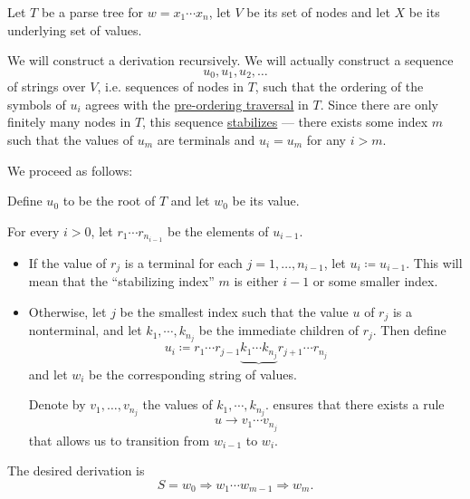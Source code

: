 \begin{algorithm}\label{alg:parse_tree_to_leftmost_derivation}
  Let \( T \) be a parse tree for \( w = x_1 \cdots x_n \), let \( V \) be its set of nodes and let \( X \) be its underlying set of values.

  We will construct a derivation recursively. We will actually construct a sequence
  \begin{equation*}
    u_0, u_1, u_2, \ldots
  \end{equation*}
  of strings over \( V \), i.e. sequences of nodes in \( T \), such that the ordering of the symbols of \( u_i \) agrees with the \hyperref[def:traversal_ordering]{pre-ordering traversal} in \( T \). Since there are only finitely many nodes in \( T \), this sequence \hyperref[def:stabilizing_sequence]{stabilizes} --- there exists some index \( m \) such that the values of \( u_m \) are terminals and \( u_i = u_m \) for any \( i > m \).

  We proceed as follows:
  \begin{thmenum}
     Define \( u_0 \) to be the root of \( T \) and let \( w_0 \) be its value.

     For every \( i > 0 \), let \( r_1 \cdots r_{n_{i-1}} \) be the elements of \( u_{i-1} \).

    \begin{itemize}
      \item If the value of \( r_j \) is a terminal for each \( j = 1, \ldots, n_{i-1} \), let \( u_i \coloneqq u_{i-1} \). This will mean that the \enquote{stabilizing index} \( m \) is either \( i - 1 \) or some smaller index.

      \item Otherwise, let \( j \) be the smallest index such that the value \( u \) of \( r_j \) is a nonterminal, and let \( k_1, \cdots, k_{n_j} \) be the immediate children of \( r_j \). Then define
      \begin{equation*}
        u_i \coloneqq r_1 \cdots r_{j-1} \underbrace{ k_1 \cdots k_{n_j} } r_{j+1} \cdots r_{n_j}
      \end{equation*}
      and let \( w_i \) be the corresponding string of values.

      Denote by \( v_1, \ldots, v_{n_j} \) the values of \( k_1, \cdots, k_{n_j} \).  ensures that there exists a rule
      \begin{equation*}
        u \to v_1 \cdots v_{n_j}
      \end{equation*}
      that allows us to transition from \( w_{i-1} \) to \( w_i \).
    \end{itemize}

     The desired derivation is
    \begin{equation*}
      S = w_0 \Rightarrow w_1 \cdots w_{m-1} \Rightarrow w_m.
    \end{equation*}
  \end{thmenum}
\end{algorithm}
